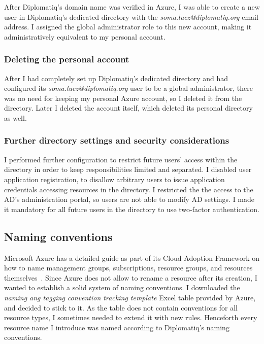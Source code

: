 After Diplomatiq's domain name was verified in Azure, I was able to create a new user in Diplomatiq's dedicated directory with the \emph{soma.lucz@diplomatiq.org} email address. I assigned the global administrator role to this new account, making it administratively equivalent to my personal account.

\subsubsection{Deleting the personal account}

After I had completely set up Diplomatiq's dedicated directory and had configured its \emph{soma.lucz@diplomatiq.org} user to be a global administrator, there was no need for keeping my personal Azure account, so I deleted it from the directory. Later I deleted the account itself, which deleted its personal directory as well.

\subsubsection{Further directory settings and security considerations}

I performed further configuration to restrict future users' access within the directory in order to keep responsibilities limited and separated. I disabled user application registration, to disallow arbitrary users to issue application credentials accessing resources in the directory. I restricted the the access to the AD's administration portal, so users are not able to modify AD settings. I made it mandatory for all future users in the directory to use two-factor authentication.

\subsection{Naming conventions}

Microsoft Azure has a detailed guide as part of its Cloud Adoption Framework on how to name management groups, subscriptions, resource groups, and resources themselves~\cite{azure-naming}. Since Azure does not allow to rename a resource after its creation, I wanted to establish a solid system of naming conventions. I downloaded the \emph{naming ang tagging convention tracking template} Excel table provided by Azure, and decided to stick to it. As the table does not contain conventions for all resource types, I sometimes needed to extend it with new rules. Henceforth every resource name I introduce was named according to Diplomatiq's naming conventions.

